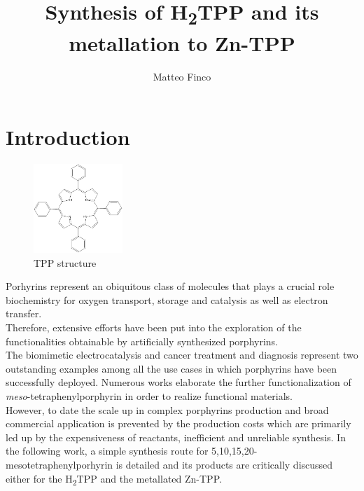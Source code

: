 \documentclass[num-refs]{wiley-article}
\title{Synthesis of \texorpdfstring{H\textsubscript{2}}-TPP and its metallation to Zn-TPP}
\author[1\authfn{1}]{Matteo Finco}
\affil[1]{DiSC, Università degli Studi di Padova, Padova, Italy, 35131, Italy}
\begin{document}
\begin{frontmatter}
\maketitle

\begin{abstract}

\end{abstract}

\end{frontmatter}

\section{Introduction}
\begin{figure}
    \includegraphics[width=0.3\textwidth]{TPP}
    \caption{TPP structure}
    \label{TPP-structure}
\end{figure}
Porhyrins represent an obiquitous class of molecules that plays a crucial role biochemistry for oxygen transport\citep{hardison_evolution_2012}, storage\citep{kendrew_three-dimensional_1958} and catalysis as well as electron transfer\citep{keilin_cytochrome_1925}.\\
Therefore, extensive efforts have been put into the exploration of the functionalities obtainable by artificially synthesized porphyrins.\\
The biomimetic electrocatalysis\cite{facchin_oxygen_2021,liang_porphyrin-based_2021} and cancer treatment and diagnosis\cite{wang_recent_2021} represent two outstanding examples among all the use cases in which porphyrins have been successfully deployed.
Numerous works elaborate the further functionalization of \textit{meso}-tetraphenylporphyrin\cite{silva_porphyrins_2006} in order to realize functional materials. \\
However, to date the scale up in complex porphyrins production and broad commercial application is prevented by the production costs which are primarily led up by the expensiveness of reactants, inefficient and unreliable synthesis.
In the following work, a simple synthesis route for 5,10,15,20-mesotetraphenylporhyrin is detailed and its products are critically discussed either for the \texorpdfstring{H\textsubscript{2}}-TPP and the metallated Zn-TPP.
\newpage
\end{document}

